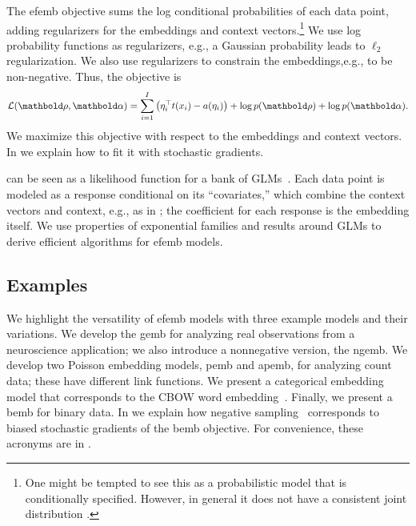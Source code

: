 \documentclass[12pt]{article}
\begin{document}
 The \gls{efemb} objective sums the
log conditional probabilities of each data point, adding regularizers
for the embeddings and context vectors.\footnote{One might be tempted
  to see this as a probabilistic model that is conditionally
  specified. However, in general it does not have a consistent joint
  distribution \citep{arnold2001conditionally}.}  We use log
probability functions as regularizers, e.g., a Gaussian probability
leads to $\ell_2$ regularization.  We also use regularizers to
constrain the embeddings,e.g., to be non-negative.  Thus, the
objective is
\begin{align}
  \label{eqn:objective}
  \mathcal{L}(\mbrho, \mbalpha)=\sum_{i=1}^I \left( \eta_{i}^\top t(x_{i}) - a(\eta_{i})\right) + \log p(\mbrho) + \log p(\mbalpha).
\end{align}
We maximize this objective with respect to the embeddings and context
vectors.  In  we explain how to fit it with
stochastic gradients.

 can be seen as a likelihood function for a bank
of \glspl{GLM}~\citep{mccullagh1989generalized}.  Each data point is
modeled as a response conditional on its ``covariates,'' which combine
the context vectors and context, e.g., as in
; the coefficient for each response is the
embedding itself.  We use properties of
exponential families and results around \glspl{GLM} to derive
efficient algorithms for \gls{efemb} models.

\subsection{Examples}
\label{sec:examples}
We highlight the versatility of \gls{efemb} models with three example
models and their variations. We develop the \gls{gemb} for analyzing
real observations from a neuroscience application; we also introduce a
nonnegative version, the \gls{ngemb}. We develop two Poisson embedding
models, \gls{pemb} and \gls{apemb}, for analyzing count data; these
have different link functions. We present a categorical embedding
model that corresponds to the \gls{CBOW} word
embedding~\citep{mikolov2013efficient}. Finally, we present a
\gls{bemb} for binary data.  In  we explain how 
negative sampling~\citep{mikolov2013distributed} corresponds to biased
stochastic gradients of the \gls{bemb} objective.
For convenience, these acronyms are in .
\end{document}
